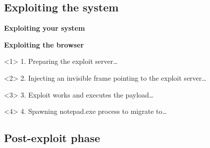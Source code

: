 \subsection{Exploiting the system}

{
\begin{frame}[plain]
    \begin{center}
      \Huge\bfseries
      Exploiting your system
    \end{center}
\end{frame}
}

{
\begin{frame}[plain]
  \begin{center}
    \LARGE\bfseries
    Exploiting the browser
  \end{center}

  \vspace{.5cm}

  \begin{onlyenv}<1>
    1. Preparing the exploit server\ldots
    \begin{center}
    \end{center}
  \end{onlyenv}

  \begin{onlyenv}<2>
    2. Injecting an invisible frame pointing to the exploit server\ldots
    \begin{center}
    \end{center}
  \end{onlyenv}

  \begin{onlyenv}<3>
    3. Exploit works and executes the payload\ldots
    \begin{center}
    \end{center}
  \end{onlyenv}

  \begin{onlyenv}<4>
    4. Spawning notepad.exe process to migrate to\ldots
    \begin{center}
    \end{center}
  \end{onlyenv}

\end{frame}
}

\subsection{Post-exploit phase}

